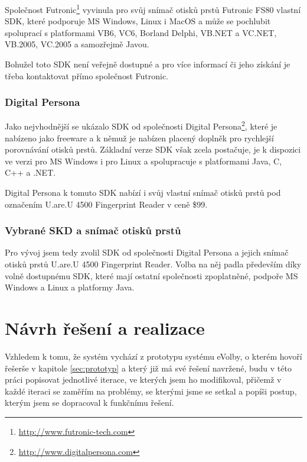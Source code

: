\documentclass[11pt,twoside,a4paper]{book}
\begin{document}
Společnost Futronic\footnote{\url{http://www.futronic-tech.com}} vyvinula pro svůj snímač otisků prstů Futronic FS80 vlastní SDK, které podporuje MS Windows, Linux i MacOS a může se pochlubit spoluprací s platformami VB6, VC6, Borland Delphi, VB.NET a VC.NET, VB.2005, VC.2005 a samozřejmě Javou.

Bohužel toto SDK není veřejně dostupné a pro více informací či jeho získání je třeba kontaktovat přímo společnost Futronic. 

\subsection{Digital Persona}

Jako nejvhodnější se ukázalo SDK od společnosti Digital Persona\footnote{\url{http://www.digitalpersona.com}}, které je nabízeno jako freeware a k němuž je nabízen placený doplněk pro rychlejší porovnávání otisků prstů. Základní verze SDK však zcela postačuje, je k dispozici ve verzi pro MS Windows i pro Linux a spolupracuje s platformami Java, C, C++ a .NET.

Digital Persona k tomuto SDK nabízí i svůj vlastní snímač otisků prstů pod označením U.are.U 4500 Fingerprint Reader v ceně \$99.

\subsection{Vybrané SKD a snímač otisků prstů}

Pro vývoj jsem tedy zvolil SDK od společnosti Digital Persona a jejich snímač otisků prstů U.are.U 4500 Fingerprint Reader. Volba na něj padla především díky volně dostupnému SDK, které mají ostatní společnosti zpoplatněné, podpoře MS Windows a Linux a platformy Java.

\chapter{Návrh řešení a realizace}


 
Vzhledem k tomu, že systém vychází z prototypu systému eVolby\cite{www:prototyp}, o kterém hovoří řešerše v kapitole \ref{sec:prototyp} a který již má své řešení navržené, budu v této práci popisovat jednotlivé iterace, ve kterých jsem ho modifikoval, přičemž v každé iteraci se zaměřím na problémy, se kterými jsme se setkal a popíši postup, kterým jsem se dopracoval k funkčnímu řešení. 
\end{document}
